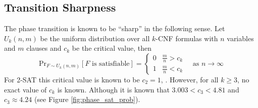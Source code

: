 \subsection{Transition Sharpness}
The phase transition is known to be ``sharp'' \cite{phase_transition}
in the following sense. Let
$U_k(n, m)$ be the uniform distribution over all $k$-CNF formulas with
$n$ variables and $m$ clauses and $c_k$ be the critical value, then
\begin{equation} \label{eq:sharp}
    \mathrm{Pr}_{F \sim U_k(n, m)}[F\text{ is satisfiable}] =
    \begin{cases}
        0 & \frac{m}{n} > c_k \\
        1 & \frac{m}{n} < c_k
    \end{cases}
    \quad\text{as }
    n \to \infty
\end{equation}
For 2-SAT this critical value is known to be $c_2 = 1$, \cite{chvatal1992mick, goerdt1996threshold}.
However, for all $k \geq 3$, no exact value of $c_k$ is known. Although it is known
that $3.003 < c_3 < 4.81$ and $c_3 \approx 4.24$ \cite{crawford1993experimental}
(see Figure \ref{fig:phase_sat_prob}).


